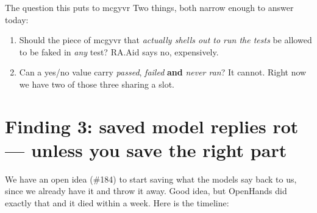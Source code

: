 \documentclass[11pt]{article}
\newcommand{\shout}[1]{\textbf{#1}}
\begin{document}
\begin{center}
\end{center}

\begin{keybox}{The question this puts to mcgyvr}
Two things, both narrow enough to answer today:
\begin{enumerate}[leftmargin=16pt, itemsep=2pt]
  \item Should the piece of mcgyvr that \emph{actually shells out to run the
        tests} be allowed to be faked in \emph{any} test? RA.Aid says no,
        expensively.
  \item Can a yes/no value carry \emph{passed}, \emph{failed} \shout{and}
        \emph{never ran}? It cannot. Right now we have two of those three
        sharing a slot.
\end{enumerate}
\end{keybox}

\newpage
\section{Finding 3: saved model replies rot --- unless you save the right part}

We have an open idea (\#184) to start saving what the models say back to us,
since we already have it and throw it away. Good idea, but OpenHands did exactly
that and it died within a week. Here is the timeline:
\end{document}
